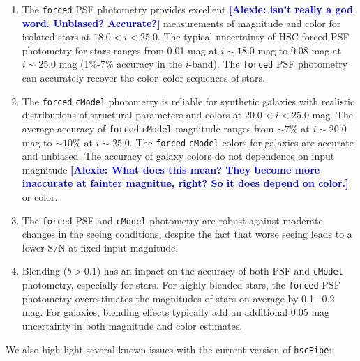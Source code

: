 \documentclass[useamsfonts]{pasj01}
\newcommand{\alexie}[1]{\textcolor{blue}{\textbf{[Alexie: #1]}}}
\def\hscpipe{\texttt{hscPipe}}
\def\cmodel{\texttt{cModel}}
\def\forced{\texttt{forced}}
\begin{document}
    \begin{enumerate}

        \item The \forced{} PSF photometry provides excellent \alexie{isn't really a god word. Unbiased? Accurate?} measurements of magnitude and color for isolated stars at $18.0 < i < 25.0$.
            The typical uncertainty of HSC forced PSF photometry for stars ranges
            from 0.01 mag at $i{\sim}18.0$ mag to 0.08 mag at $i{\sim}25.0$
            mag (1\%-7\% accuracy in the $i$-band).
            The \forced{} PSF photometry can accurately recover the color--color
            sequences of stars.

        \item The \forced{} \cmodel{} photometry is reliable for synthetic galaxies
            with realistic distributions of structural parameters and colors at
            $20.0 < i < 25.0$ mag.
            The average accuracy of \forced{} \cmodel{} magnitude ranges from
            ${\sim}7$\% at $i{\sim}20.0$ mag to ${\sim}10$\% at $i{\sim}25.0$.
            The \forced{} \cmodel{} colors for galaxies are accurate and unbiased.
            The accuracy of galaxy colors do not dependence on input magnitude \alexie{What does this mean? They become more inaccurate at fainter magnitue, right? So it does depend on color.} or
            color.

        \item The \forced{} PSF and \cmodel{} photometry are robust against moderate changes in the seeing conditions, despite the fact that worse seeing leads to a lower
            $\mathrm{S}/\mathrm{N}$ at fixed input magnitude.

        \item Blending ($b>0.1$) has an impact on the accuracy of both PSF and \cmodel{}
            photometry, especially for stars.
            For highly blended stars, the \forced{} PSF photometry overestimates the magnitudes of stars on average by 0.1–-0.2 mag.
            For galaxies, blending effects typically add an additional 0.05 mag
            uncertainty in both magnitude and color estimates.
    \end{enumerate}
    
    \vspace{0.5cm}
    \noindent We also high-light several known issues with the  current version of \hscpipe{}:
\end{document}
